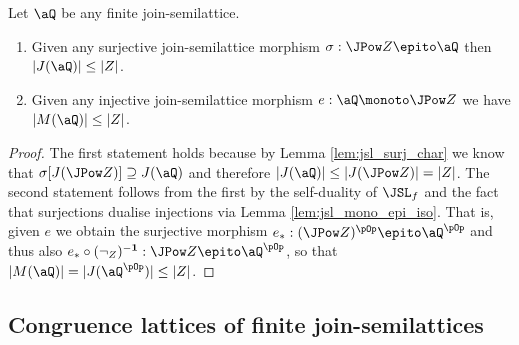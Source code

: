 \documentclass{article}
\begin{document}
\begin{lemma}
\label{lem:canon_surj_inj_mor_tight}
Let $\aQ$ be any finite join-semilattice.
\begin{enumerate}
\item
Given any surjective join-semilattice morphism $\sigma : \JPow Z \epito \aQ$ then $|J(\aQ)| \leq |Z|$.
\item
Given any injective join-semilattice morphism $e : \aQ \monoto \JPow Z$ we have $|M(\aQ)| \leq |Z|$.
\end{enumerate}
\end{lemma}

\begin{proof}
The first statement holds because by Lemma \ref{lem:jsl_surj_char} we know that $\sigma[J(\JPow Z)] \supseteq J(\aQ)$ and therefore $|J(\aQ)| \leq |J(\JPow Z)| = |Z|$. The second statement follows from the first by the self-duality of $\JSL_f$ and the fact that surjections dualise injections via Lemma \ref{lem:jsl_mono_epi_iso}. That is, given $e$ we obtain the surjective morphism $e_* : (\JPow Z)^{\pOp} \epito \aQ^{\pOp}$ and thus also $e_* \circ (\neg_Z)^{\bf-1} : \JPow Z \epito \aQ^{\pOp}$, so that $|M(\aQ)| = |J(\aQ^{\pOp})| \leq |Z|$.
\end{proof}


\subsection{Congruence lattices of finite join-semilattices}
\end{document}
